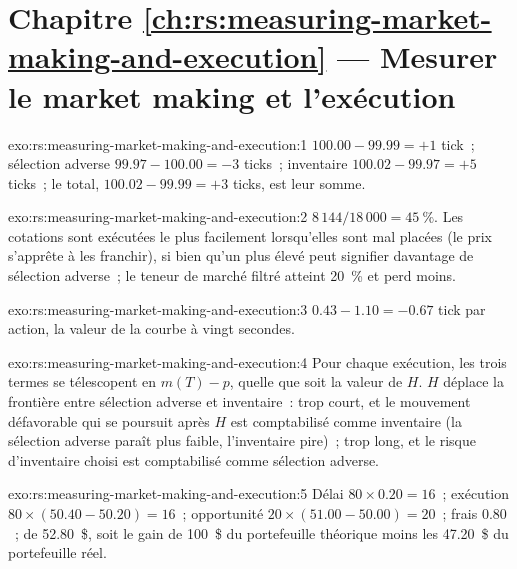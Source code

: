 \section*{Chapitre \ref{ch:rs:measuring-market-making-and-execution} --- Mesurer le market making et l'exécution}

\begin{solution}{exo:rs:measuring-market-making-and-execution:1}
 $100.00 - 99.99 = +1$ tick~; sélection adverse $99.97 - 100.00 = -3$ ticks~; inventaire $100.02 - 99.97 = +5$ ticks~; le total, $100.02 - 99.99 = +3$ ticks,
est leur somme.
\end{solution}

\begin{solution}{exo:rs:measuring-market-making-and-execution:2}
$8\,144/18\,000 = 45~\%$. Les cotations sont exécutées le plus facilement lorsqu'elles sont mal placées (le prix s'apprête à les franchir), si bien qu'un
 plus élevé peut signifier davantage de sélection adverse~; le teneur de marché filtré atteint 20~\% et perd moins.
\end{solution}

\begin{solution}{exo:rs:measuring-market-making-and-execution:3}
$0.43 - 1.10 = -0.67$ tick par action, la valeur de la courbe à vingt secondes.
\end{solution}

\begin{solution}{exo:rs:measuring-market-making-and-execution:4}
Pour chaque exécution, les trois termes se télescopent en $m(T) - p$, quelle que soit la valeur de $H$. $H$ déplace la frontière entre sélection adverse et inventaire~: trop court, et le
mouvement défavorable qui se poursuit après $H$ est comptabilisé comme inventaire (la sélection adverse paraît plus faible, l'inventaire pire)~; trop long, et le risque
d'inventaire choisi est comptabilisé comme sélection adverse.
\end{solution}

\begin{solution}{exo:rs:measuring-market-making-and-execution:5}
Délai $80 \times 0.20 = 16$~; exécution $80 \times (50.40 - 50.20) = 16$~; opportunité $20 \times (51.00 - 50.00) = 20$~; frais $0.80$~;  de 52.80~\$,
soit le gain de 100~\$ du portefeuille théorique moins les 47.20~\$ du portefeuille réel.
\end{solution}


